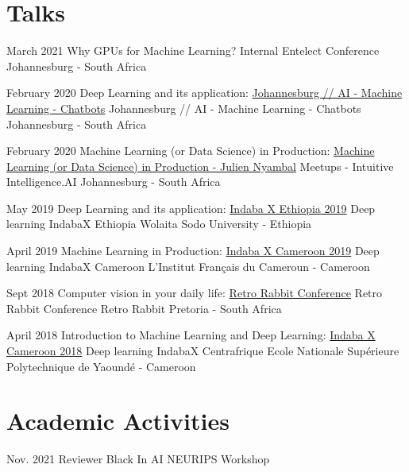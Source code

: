 \documentclass[letterpaper]{moderncv}        %
\begin{document}
\vspace{1mm}


\section{Talks}

\cventry
{March 2021}
{Why GPUs for Machine Learning?}
{Internal Entelect Conference}
{Johannesburg - South Africa}
{}
{}

\cventry
{February 2020}
{Deep Learning and its application: \href{https://www.meetup.com/Johannesburg-Artificial-Intelligence-Meetup/events/268234198/}{Johannesburg // AI - Machine Learning - Chatbots}}
{Johannesburg // AI - Machine Learning - Chatbots}
{Johannesburg - South Africa}
{}
{}

\cventry
{February 2020}
{Machine Learning (or Data Science) in Production: \href{https://www.frenchtechsa.com/projects/machine-learning-(or-data-science)-in-production}{Machine Learning (or Data Science) in Production - Julien Nyambal}}
{Meetups - Intuitive Intelligence.AI}
{Johannesburg - South Africa}
{}
{}

\cventry
{May 2019}
{Deep Learning and its application: \href{https://sites.google.com/view/indabaxethiopia2019/speakers?authuser=0}{Indaba X Ethiopia 2019}}
{Deep learning IndabaX Ethiopia}
{Wolaita Sodo University - Ethiopia}
{}
{}

\cventry
{April 2019}
{Machine Learning in Production:    \href{https://indabaxcameroon.github.io}{Indaba X Cameroon 2019}}
{Deep learning IndabaX Cameroon}
{L'Institut Français du Cameroun - Cameroon}
{}
{}


\cventry
{Sept 2018}
{Computer vision in your daily life: \href{https://www.youtube.com/watch?v=0Z--tiJ3FyE}
	{Retro Rabbit Conference}}
{Retro Rabbit Conference}
{Retro Rabbit Pretoria - South Africa}
{}
{}

\cventry
{April 2018}
{Introduction to Machine Learning and Deep Learning: \href{http://www.deeplearningindaba.com/indabax-centrafrique.html}{Indaba X Cameroon 2018}}
{Deep learning IndabaX Centrafrique}
{Ecole Nationale Supérieure Polytechnique de Yaoundé - Cameroon}
{}
{}
	
\vspace{9mm}	

\section{Academic Activities}	

\cventry
{Nov. 2021}
{Reviewer Black In AI}
{NEURIPS Workshop}
{}
{}
{}
\end{document}
